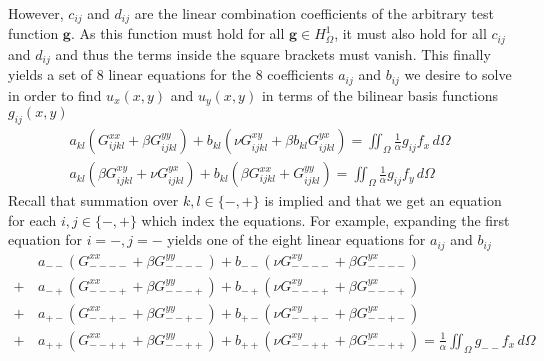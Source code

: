 \documentclass[11pt]{article}
\begin{document}
However, $c_{ij}$ and $d_{ij}$ are the linear combination coefficients of the arbitrary test function $\bm{g}$. As this function must hold for all $\bm{g} \in H^1_\Omega$, it must also hold for all $c_{ij}$ and $d_{ij}$ and thus the terms inside the square brackets must vanish. This finally yields a set of 8 linear equations for the 8 coefficients $a_{ij}$ and $b_{ij}$ we desire to solve in order to find $u_x(x,y)$ and $u_y(x,y)$ in terms of the bilinear basis functions $g_{ij}(x,y)$
\begin{subequations}
\begin{gather}
  a_{kl} \left( G_{ijkl}^{xx} + \beta G_{ijkl}^{yy} \right)
    + b_{kl} \left( \nu G_{ijkl}^{xy} + \beta b_{kl} G_{ijkl}^{yx} \right)
    = \iint_\Omega \frac{1}{\alpha}g_{ij}f_x \, d\Omega \\
  a_{kl} \left( \beta G_{ijkl}^{xy} + \nu G_{ijkl}^{yx} \right)
    + b_{kl} \left( \beta G_{ijkl}^{xx} + G_{ijkl}^{yy} \right)
    = \iint_\Omega \frac{1}{\alpha}g_{ij}f_y \, d\Omega
\end{gather}
\end{subequations}
Recall that summation over $k,l \in \{-,+\}$ is implied and that we get an equation for each $i,j \in \{-,+\}$ which index the equations. For example, expanding the first equation for $i=-,j=-$ yields one of the eight linear equations for $a_{ij}$ and $b_{ij}$
\begin{equation}
\begin{aligned}
  & a_{--} \left( G_{----}^{xx} + \beta G_{----}^{yy} \right)
  + b_{--} \left( \nu G_{----}^{xy} + \beta G_{----}^{yx} \right) \\
  + \, & a_{-+} \left( G_{---+}^{xx} + \beta G_{---+}^{yy} \right)
  + b_{-+} \left( \nu G_{---+}^{xy} + \beta G_{---+}^{yx} \right) \\
  + \, & a_{+-} \left( G_{--+-}^{xx} + \beta G_{--+-}^{yy} \right)
  + b_{+-} \left( \nu G_{--+-}^{xy} + \beta G_{--+-}^{yx} \right)  \\
  + \, & a_{++} \left( G_{--++}^{xx} + \beta G_{--++}^{yy} \right)
  + b_{++} \left( \nu G_{--++}^{xy} + \beta G_{--++}^{yx} \right)
  = \frac{1}{\alpha} \iint_\Omega g_{--}f_x \, d\Omega
\end{aligned}
\end{equation}
\end{document}
